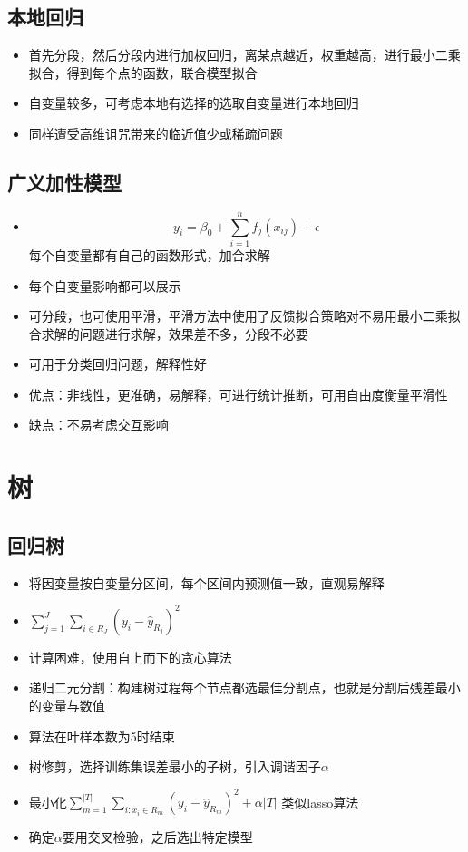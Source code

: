 \documentclass[]{book}
\providecommand{\tightlist}{%
  \setlength{\itemsep}{0pt}\setlength{\parskip}{0pt}}
\begin{document}
\subsection{本地回归}

\begin{itemize}
\tightlist
\item
  首先分段，然后分段内进行加权回归，离某点越近，权重越高，进行最小二乘拟合，得到每个点的函数，联合模型拟合
\item
  自变量较多，可考虑本地有选择的选取自变量进行本地回归
\item
  同样遭受高维诅咒带来的临近值少或稀疏问题
\end{itemize}

\subsection{广义加性模型}

\begin{itemize}
\tightlist
\item
  \[y_i = \beta_0 + \sum_{i = 1}^n f_j(x_{ij}) + \epsilon\] 每个自变量都有自己的函数形式，加合求解
\item
  每个自变量影响都可以展示
\item
  可分段，也可使用平滑，平滑方法中使用了反馈拟合策略对不易用最小二乘拟合求解的问题进行求解，效果差不多，分段不必要
\item
  可用于分类回归问题，解释性好
\item
  优点：非线性，更准确，易解释，可进行统计推断，可用自由度衡量平滑性
\item
  缺点：不易考虑交互影响
\end{itemize}

\section{树}

\subsection{回归树}

\begin{itemize}
\tightlist
\item
  将因变量按自变量分区间，每个区间内预测值一致，直观易解释
\item
  \(\sum_{j = 1}^J\sum_{i \in R_J}(y_i - \hat y_{R_j})^2\)
\item
  计算困难，使用自上而下的贪心算法
\item
  递归二元分割：构建树过程每个节点都选最佳分割点，也就是分割后残差最小的变量与数值
\item
  算法在叶样本数为5时结束
\item
  树修剪，选择训练集误差最小的子树，引入调谐因子\(\alpha\)
\item
  最小化\(\sum_{m = 1}^{|T|} \sum_{i:x_i \in R_m} (y_i - \hat y_{R_m})^2 + \alpha|T|\) 类似lasso算法
\item
  确定\(\alpha\)要用交叉检验，之后选出特定模型
\end{itemize}
\end{document}

